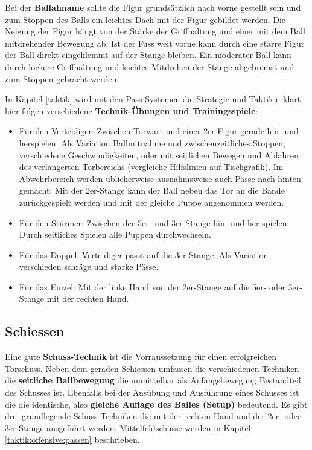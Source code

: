 Bei der \textbf{Ballahname} sollte die Figur grundsätzlich nach vorne gestellt sein und zum Stoppen des Balls ein leichtes Dach mit der Figur gebildet werden. 
Die Neigung der Figur hängt von der Stärke der Griffhaltung und einer mit dem Ball mitdrehender Bewegung ab: 
Ist der Fuss weit vorne kann durch eine starre Figur der Ball direkt eingeklemmt auf der Stange bleiben.
Ein moderater Ball kann durch lockere Griffhaltung und leichtes Mitdrehen der Stange abgebremst und zum Stoppen gebracht werden.

In Kapitel \ref{taktik} wird mit den Pass-Systemen die Strategie und Taktik erklärt, hier folgen verschiedene \textbf{Technik-Übungen und Trainingsspiele}: 
\begin{itemize}
    \item Für den Verteidiger: Zwischen Torwart und einer 2er-Figur gerade hin- und herspielen. Als Variation Ballmitnahme und zwischenzeitliches Stoppen, verschiedene Geschwindigkeiten, oder mit seitlichen Bewegen und Abfahren des verlängerten Torbereichs (vergleiche Hilfslinien auf Tischgrafik).  
        Im Abwehrbereich werden üblicherweise ausnahmsweise auch Pässe nach hinten gemacht: Mit der 2er-Stange kann der Ball neben das Tor an die Bande zurückgespielt werden und mit der gleiche Puppe angenommen werden.
    \item Für den Stürmer: Zwischen der 5er- und 3er-Stange hin- und her spielen. Durch seitliches Spielen alle Puppen durchwechseln.
    \item Für das Doppel: Verteidiger passt auf die 3er-Stange. Als Variation verschieden schräge und starke Pässe.  
    \item Für das Einzel: Mit der linke Hand von der 2er-Stange auf die 5er- oder 3er-Stange mit der rechten Hand.
\end{itemize}



\subsection{Schiessen}
\label{technik:offensive:schiessen}

Eine gute \textbf{Schuss-Technik} ist die Vorraussetzung für einen erfolgreichen Torschuss.
Neben dem geraden Schiessen umfassen die verschiedenen Techniken die \textbf{seitliche Ballbewegung} die unmittelbar als Anfangsbewegung Bestandteil des Schusses ist.
Ebenfalls bei der Ausübung und Ausführung eines Schusses ist die die identische, also \textbf{gleiche Auflage des Balles (Setup)} bedeutend.
Es gibt drei grundlegende Schuss-Techniken die mit der rechten Hand und der 2er- oder 3er-Stange ausgeführt werden. 
Mittelfeldschüsse werden in Kapitel \ref{taktik:offensive:passen} beschrieben.

